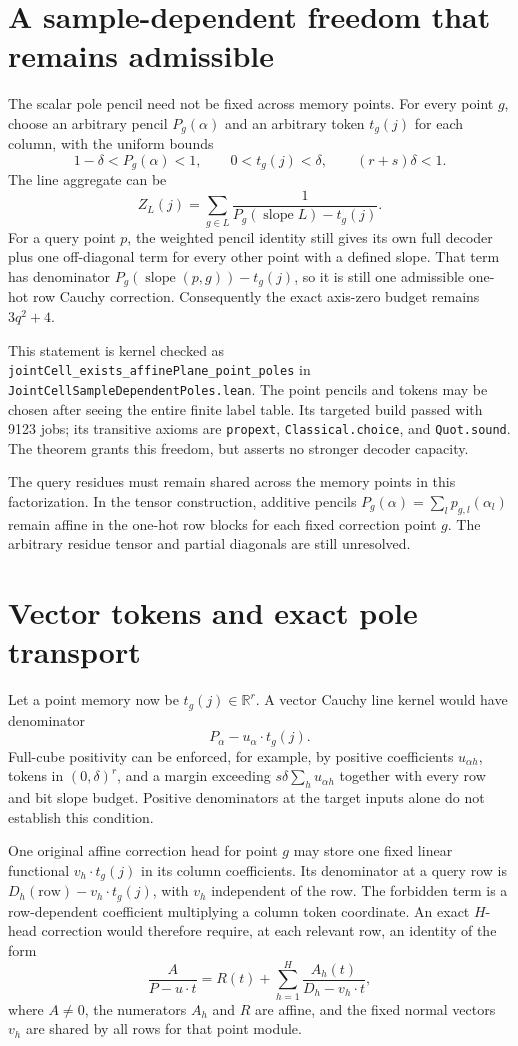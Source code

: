 \documentclass[11pt]{article}
\begin{document}
\section{A sample-dependent freedom that remains admissible}

The scalar pole pencil need not be fixed across memory points. For every
point $g$, choose an arbitrary pencil $P_g(\alpha)$ and an arbitrary token
$t_g(j)$ for each column, with the uniform bounds
\[
 1-\delta<P_g(\alpha)<1,\qquad
 0<t_g(j)<\delta,\qquad (r+s)\delta<1.
\]
The line aggregate can be
\[
 Z_L(j)=\sum_{g\in L}\frac{1}{P_g(\operatorname{slope}L)-t_g(j)}.
\]
For a query point $p$, the weighted pencil identity still gives its own
full decoder plus one off-diagonal term for every other point with a
defined slope. That term has denominator
$P_g(\operatorname{slope}(p,g))-t_g(j)$, so it is still one admissible
one-hot row Cauchy correction. Consequently the exact axis-zero budget
remains $3q^2+4$.

This statement is kernel checked as
\texttt{jointCell\_exists\_affinePlane\_point\_poles} in
\texttt{JointCellSampleDependentPoles.lean}. The point pencils and tokens
may be chosen after seeing the entire finite label table. Its targeted
build passed with 9123 jobs; its transitive axioms are
\texttt{propext}, \texttt{Classical.choice}, and \texttt{Quot.sound}.
The theorem grants this freedom, but asserts no stronger decoder capacity.

The query residues must remain shared across the memory points in this
factorization. In the tensor construction, additive pencils
$P_g(\alpha)=\sum_l p_{g,l}(\alpha_l)$ remain affine in the one-hot row
blocks for each fixed correction point $g$. The arbitrary residue tensor
and partial diagonals are still unresolved.

\section{Vector tokens and exact pole transport}

Let a point memory now be $t_g(j)\in\mathbb R^r$. A vector Cauchy line
kernel would have denominator
\[
 P_\alpha-u_\alpha\cdot t_g(j).
\]
Full-cube positivity can be enforced, for example, by positive coefficients
$u_{\alpha h}$, tokens in $(0,\delta)^r$, and a margin exceeding
$s\delta\sum_hu_{\alpha h}$ together with every row and bit slope budget.
Positive denominators at the target inputs alone do not establish this
condition.

One original affine correction head for point $g$ may store one fixed
linear functional $v_h\cdot t_g(j)$ in its column coefficients. Its
denominator at a query row is
$D_h(\text{row})-v_h\cdot t_g(j)$, with $v_h$ independent of the row.
The forbidden term is a row-dependent coefficient multiplying a column
token coordinate. An exact $H$-head correction would therefore require,
at each relevant row, an identity of the form
\[
 \frac{A}{P-u\cdot t}
 =R(t)+\sum_{h=1}^H
 \frac{A_h(t)}{D_h-v_h\cdot t},
\]
where $A\ne0$, the numerators $A_h$ and $R$ are affine, and the fixed
normal vectors $v_h$ are shared by all rows for that point module.
\end{document}
